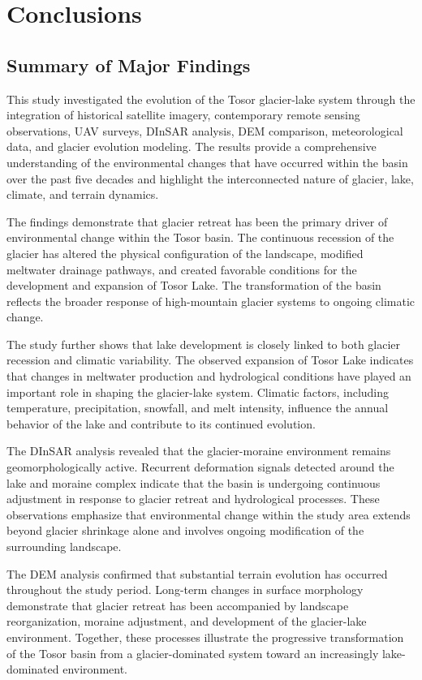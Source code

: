\documentclass[12pt,a4paper]{report}
\begin{document}
\chapter{Conclusions}

\section{Summary of Major Findings}

This study investigated the evolution of the Tosor glacier-lake system through the integration of historical satellite imagery, contemporary remote sensing observations, UAV surveys, DInSAR analysis, DEM comparison, meteorological data, and glacier evolution modeling. The results provide a comprehensive understanding of the environmental changes that have occurred within the basin over the past five decades and highlight the interconnected nature of glacier, lake, climate, and terrain dynamics.

The findings demonstrate that glacier retreat has been the primary driver of environmental change within the Tosor basin. The continuous recession of the glacier has altered the physical configuration of the landscape, modified meltwater drainage pathways, and created favorable conditions for the development and expansion of Tosor Lake. The transformation of the basin reflects the broader response of high-mountain glacier systems to ongoing climatic change.

The study further shows that lake development is closely linked to both glacier recession and climatic variability. The observed expansion of Tosor Lake indicates that changes in meltwater production and hydrological conditions have played an important role in shaping the glacier-lake system. Climatic factors, including temperature, precipitation, snowfall, and melt intensity, influence the annual behavior of the lake and contribute to its continued evolution.

The DInSAR analysis revealed that the glacier-moraine environment remains geomorphologically active. Recurrent deformation signals detected around the lake and moraine complex indicate that the basin is undergoing continuous adjustment in response to glacier retreat and hydrological processes. These observations emphasize that environmental change within the study area extends beyond glacier shrinkage alone and involves ongoing modification of the surrounding landscape.

The DEM analysis confirmed that substantial terrain evolution has occurred throughout the study period. Long-term changes in surface morphology demonstrate that glacier retreat has been accompanied by landscape reorganization, moraine adjustment, and development of the glacier-lake environment. Together, these processes illustrate the progressive transformation of the Tosor basin from a glacier-dominated system toward an increasingly lake-dominated environment.
\end{document}
